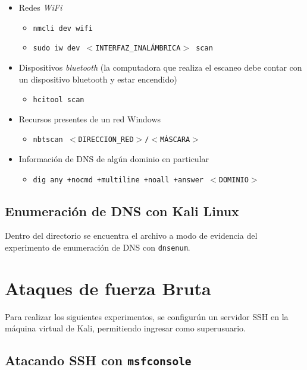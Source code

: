 \begin{itemize}
    \item Redes \emph{WiFi} 
    \begin{itemize}
        \item \texttt{nmcli dev wifi} 
        \item \texttt{sudo iw dev $<$INTERFAZ\_INALÁMBRICA$>$ scan} 
    \end{itemize}
    \item Dispositivos \emph{bluetooth} (la computadora que realiza el escaneo debe contar con un dispositivo bluetooth y estar encendido) 
    \begin{itemize}
        \item \texttt{hcitool scan} 
    \end{itemize}
    \item Recursos presentes de un red Windows
    \begin{itemize}
        \item \texttt{nbtscan $<$DIRECCION\_RED$>$/$<$MÁSCARA$>$} 
    \end{itemize}
    \item Información de DNS de algún dominio en particular
    \begin{itemize}
        \item \texttt{dig any +nocmd +multiline +noall +answer $<$DOMINIO$>$} 
    \end{itemize}
\end{itemize}

\subsection{Enumeración de DNS con Kali Linux}

Dentro del directorio  se encuentra el archivo  a modo de evidencia del experimento de enumeración de DNS con \texttt{dnsenum}. 


\section{Ataques de fuerza Bruta}

Para realizar los siguientes experimentos, se configurún un servidor SSH en la máquina virtual de Kali, permitiendo ingresar como superusuario.

\subsection{Atacando SSH con \texttt{msfconsole}}

